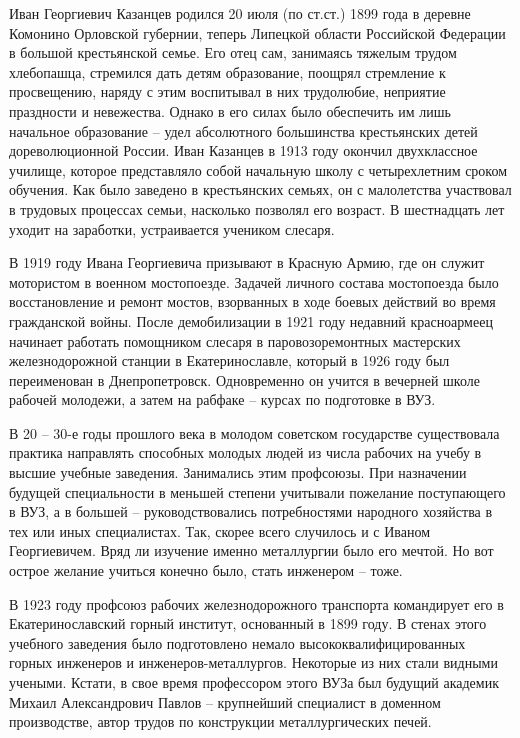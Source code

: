 Иван Георгиевич Казанцев родился 20 июля (по ст.ст.) 1899 года в деревне
Комонино Орловской губернии, теперь Липецкой области Российской Федерации в
большой крестьянской семье. Его отец сам, занимаясь тяжелым трудом хлебопашца,
стремился дать детям образование, поощрял стремление к просвещению, наряду с
этим воспитывал в них трудолюбие, неприятие праздности и невежества. Однако в
его силах было обеспечить им лишь начальное образование – удел абсолютного
большинства крестьянских детей дореволюционной России. Иван Казанцев в 1913
году окончил двухклассное училище, которое представляло собой начальную школу
с четырехлетним сроком обучения. Как было заведено в крестьянских семьях, он с
малолетства участвовал в трудовых процессах семьи, насколько позволял его
возраст. В шестнадцать лет уходит на заработки, устраивается учеником слесаря.

В 1919 году Ивана Георгиевича призывают в Красную Армию, где он служит
мотористом в военном мостопоезде. Задачей личного состава мостопоезда было
восстановление и ремонт мостов, взорванных в ходе боевых действий во время
гражданской войны. После демобилизации в 1921 году недавний красноармеец
начинает работать помощником слесаря в паровозоремонтных мастерских
железнодорожной станции в Екатеринославле, который в 1926 году был переименован
в Днепропетровск. Одновременно он учится в вечерней школе рабочей молодежи, а
затем на рабфаке – курсах по подготовке в ВУЗ.

В 20 – 30-е годы прошлого века в молодом советском государстве существовала
практика направлять способных молодых людей из числа рабочих на учебу в высшие
учебные заведения. Занимались этим профсоюзы. При назначении будущей
специальности в меньшей степени учитывали пожелание поступающего в ВУЗ, а в
большей – руководствовались потребностями народного хозяйства в тех или иных
специалистах. Так, скорее всего случилось и с Иваном Георгиевичем. Вряд ли
изучение именно металлургии было его мечтой. Но вот острое желание учиться
конечно было, стать инженером – тоже.

В 1923 году профсоюз рабочих железнодорожного транспорта командирует его в
Екатеринославский горный институт, основанный в 1899 году. В стенах этого
учебного заведения было подготовлено немало высококвалифицированных горных
инженеров и инженеров-металлургов. Некоторые из них стали видными учеными.
Кстати, в свое время профессором этого ВУЗа был будущий академик Михаил
Александрович Павлов – крупнейший специалист в доменном производстве, автор
трудов по конструкции металлургических печей.

